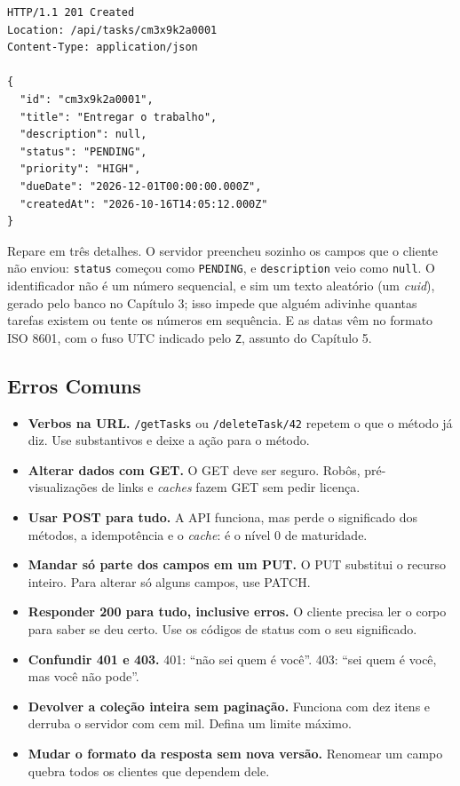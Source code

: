 \begin{codigo}
\begin{Verbatim}[breaklines=true, breaksymbolleft={}, fontsize=\footnotesize]
HTTP/1.1 201 Created
Location: /api/tasks/cm3x9k2a0001
Content-Type: application/json

{
  "id": "cm3x9k2a0001",
  "title": "Entregar o trabalho",
  "description": null,
  "status": "PENDING",
  "priority": "HIGH",
  "dueDate": "2026-12-01T00:00:00.000Z",
  "createdAt": "2026-10-16T14:05:12.000Z"
}
\end{Verbatim}
\end{codigo}

Repare em três detalhes. O servidor preencheu sozinho os campos que o cliente não enviou: \texttt{status} começou como \texttt{PENDING}, e \texttt{description} veio como \texttt{null}. O identificador não é um número sequencial, e sim um texto aleatório (um \textit{cuid}), gerado pelo banco no Capítulo 3; isso impede que alguém adivinhe quantas tarefas existem ou tente os números em sequência. E as datas vêm no formato ISO 8601, com o fuso UTC indicado pelo \texttt{Z}, assunto do Capítulo 5.

\subsection{Erros Comuns}

\begin{itemize}
  \item \textbf{Verbos na URL.} \texttt{/getTasks} ou \texttt{/deleteTask/42} repetem o que o método já diz. Use substantivos e deixe a ação para o método.
  \item \textbf{Alterar dados com GET.} O GET deve ser seguro. Robôs, pré-visualizações de links e \textit{caches} fazem GET sem pedir licença.
  \item \textbf{Usar POST para tudo.} A API funciona, mas perde o significado dos métodos, a idempotência e o \textit{cache}: é o nível 0 de maturidade.
  \item \textbf{Mandar só parte dos campos em um PUT.} O PUT substitui o recurso inteiro. Para alterar só alguns campos, use PATCH.
  \item \textbf{Responder 200 para tudo, inclusive erros.} O cliente precisa ler o corpo para saber se deu certo. Use os códigos de status com o seu significado.
  \item \textbf{Confundir 401 e 403.} 401: ``não sei quem é você''. 403: ``sei quem é você, mas você não pode''.
  \item \textbf{Devolver a coleção inteira sem paginação.} Funciona com dez itens e derruba o servidor com cem mil. Defina um limite máximo.
  \item \textbf{Mudar o formato da resposta sem nova versão.} Renomear um campo quebra todos os clientes que dependem dele.
\end{itemize}
